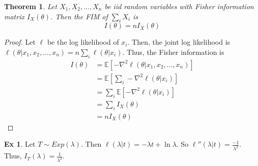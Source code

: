 \documentclass{article}
\newtheorem{theorem}{Theorem}
\theoremstyle{definition}\newtheorem{definition}{DEF}
\theoremstyle{definition}\newtheorem{example}{Ex}
\theoremstyle{lemma}\newtheorem{lemma}{Lemma}
\theoremstyle{corrolary}\newtheorem{corrolary}{Cor}
\begin{document}
\begin{theorem}
Let $X_1, X_2, ..., X_n$ be iid random variables with Fisher information matrix $I_X(\theta)$.
Then the FIM of $\sum_i X_i$ is
\begin{equation}
I(\theta)=n I_X(\theta)
\end{equation}
\end{theorem}
\begin{proof}
Let $\ell$ be the log likelihood of $x_i$.
Then, the joint log likelihood is $\ell(\theta | x_1, x_2, ..., x_n)=n\sum_i \ell(\theta | x_i)$.
Thus, the Fisher information is
\begin{align*}
I(\theta)
&= \mathbb{E} \left[ -\nabla^2 \ell (\theta | x_1, x_2, ..., x_n) \right] \\
&= \mathbb{E}\left[ \sum_i -\nabla^2 \ell (\theta | x_i )\right] \\
&= \sum_i \mathbb{E}\left[ -\nabla^2 \ell ( \theta | x_i) \right] \\
&= \sum_i I_X(\theta) \\
&= nI_X(\theta)
\end{align*}
\end{proof}

\begin{example}
Let $T\sim Exp(\lambda)$.
Then $\ell(\lambda | t) = -\lambda t + \ln \lambda$.
So $\ell''(\lambda | t) = \frac{-1}{\lambda^2}$.
Thus, $I_T(\lambda)=\frac{1}{\lambda^2}$.
\end{example}
\end{document}
